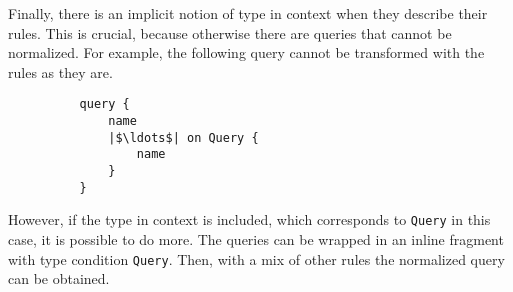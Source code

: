 Finally, there is an implicit notion of type in context when they describe their rules. This is crucial, because otherwise there are queries that cannot be normalized. For example, the following query cannot be transformed with the rules as they are.
\begin{verbatim}
          query {
              name
              |$\ldots$| on Query {
                  name
              }
          }
\end{verbatim}
However, if the type in context is included, which corresponds to \texttt{Query} in this case, it is possible to do more. The queries can be wrapped in an inline fragment with type condition \texttt{Query}. Then, with a mix of other rules the normalized query can be obtained.

